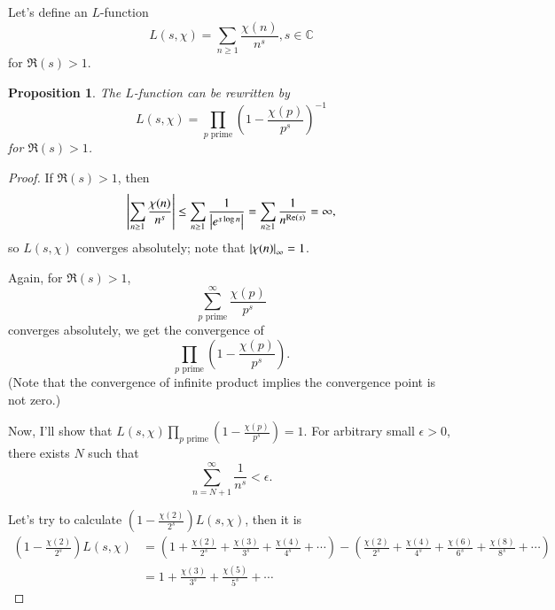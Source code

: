 \documentclass[a4paper, 12pt]{article}
\theoremstyle{Mydefinition}
\theoremstyle{Mytheorem}
\newtheorem{proposition}[statement]{Proposition}
\begin{document}
Let's define an $L$-function
\begin{equation*}
    L(s,\chi) = \sum_{n\geq 1}\frac{\chi(n)}{n^s},s\in\mathbb{C}
\end{equation*}
for $\Re(s)>1$.
\begin{proposition}
The $L$-function can be rewritten by
\begin{equation*}
    L(s,\chi) = \prod_{p\textrm{ prime}}\left(1-\frac{\chi(p)}{p^s}\right)^{-1}
\end{equation*}
for $\Re(s)>1$.
\end{proposition}
\begin{proof}

If $\Re(s)>1$, then 
\begin{equation*}
    \abs{\sum_{n\geq 1}\frac{\chi(n)}{n^s}}\leq \sum_{n\geq 1}\frac{1}{\abs{e^{s\log n}}} = \sum_{n\geq 1}\frac{1}{n^{\Re(s)}} = \infty,
\end{equation*}
so $L(s,\chi)$ converges absolutely; note that $\abs{\chi(n)}_\infty  = 1$.

Again, for $\Re(s)>1$,
\begin{equation*}
    \sum_{p\textrm{ prime}}^\infty \frac{\chi(p)}{p^s}
\end{equation*}
converges absolutely, we get the convergence of
\begin{equation*}
    \prod_{p\textrm{ prime}}\left(1-\frac{\chi(p)}{p^s}\right).
\end{equation*}
(Note that the convergence of infinite product implies the convergence point is not zero.)

Now, I'll show that $L(s,\chi)\prod_{p\textrm{ prime}}\left(1-\frac{\chi(p)}{p^s}\right) = 1$. For arbitrary small $\epsilon>0$, there exists $N$ such that
\begin{equation*}
    \sum_{n=N+1}^\infty \frac{1}{n^s}<\epsilon.
\end{equation*}

Let's try to calculate $\left(1-\frac{\chi(2)}{2^s}\right)L(s,\chi)$, then it is
\begin{equation*}
\begin{split}
    \left(1-\frac{\chi(2)}{2^s}\right)L(s,\chi) &= \left(1+\frac{\chi(2)}{2^s}+\frac{\chi(3)}{3^s} + \frac{\chi(4)}{4^s}+\cdots\right) - \left(\frac{\chi(2)}{2^s}+\frac{\chi(4)}{4^s}+\frac{\chi(6)}{6^s} + \frac{\chi(8)}{8^s}+\cdots\right)\\
    &=1+\frac{\chi(3)}{3^s}+\frac{\chi(5)}{5^s}+\cdots
\end{split}
\end{equation*}


\end{proof}
\end{document}
